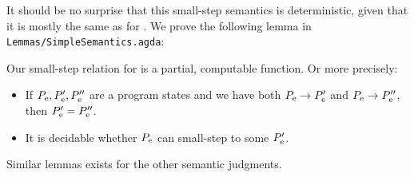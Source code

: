 It should be no surprise that this small-step semantics is deterministic, given
that it is mostly the same as for \ATAL. We prove the following lemma in
\texttt{Lemmas/SimpleSemantics.agda}:

\begin{lemma}
  \label{lemma:computsimple}
  Our small-step relation for \ATALe is a partial, computable function. Or more
  precisely:

  \begin{itemize}
  \item If $P_{\mathrm{e}}, P'_{\mathrm{e}}, P''_{\mathrm{e}}$ are a program states and we
    have both ${P_{\mathrm{e}}} -> {P'_{\mathrm{e}}}$ and
    ${P_{\mathrm{e}}} -> {P''_{\mathrm{e}}}$, then
    $P'_{\mathrm{e}} = P''_{\mathrm{e}}$.
  \item It is decidable whether $P_{\mathrm{e}}$ can small-step to some
    $P'_{\mathrm{e}}$.
  \end{itemize}

  Similar lemmas exists for the other semantic judgments.
\end{lemma}
